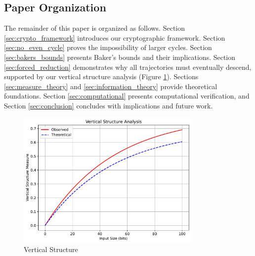\subsection{Paper Organization}
The remainder of this paper is organized as follows. Section \ref{sec:crypto_framework} introduces our cryptographic framework. Section \ref{sec:no_even_cycle} proves the impossibility of larger cycles. Section \ref{sec:bakers_bounds} presents Baker's bounds and their implications. Section \ref{sec:forced_reduction} demonstrates why all trajectories must eventually descend, supported by our vertical structure analysis (Figure \ref{fig:vertical_structure_intro}). Sections \ref{sec:measure_theory} and \ref{sec:information_theory} provide theoretical foundations. Section \ref{sec:computational} presents computational verification, and Section \ref{sec:conclusion} concludes with implications and future work.

\begin{figure}[ht]
\centering
\includegraphics[width=0.8\textwidth]{py_visuals/figures/vertical_structure.pdf}
\caption{Vertical Structure}
\label{fig:vertical_structure_intro}
\end{figure} 
